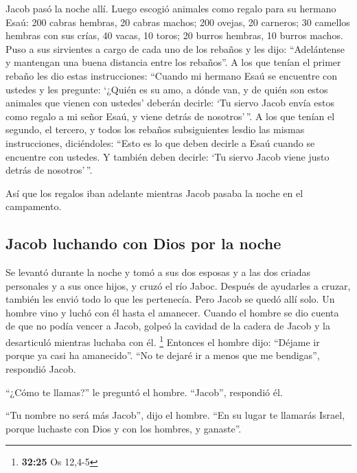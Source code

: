  Jacob pasó la noche allí. Luego escogió animales como
regalo para su hermano Esaú:  200 cabras hembras, 20
cabras machos; 200 ovejas, 20 carneros;  30 camellos
hembras con sus crías, 40 vacas, 10 toros; 20 burros hembras, 10 burros
machos.  Puso a sus sirvientes a cargo de cada uno de los
rebaños y les dijo: ``Adelántense y mantengan una buena distancia entre
los rebaños''.  A los que tenían el primer rebaño les dio
estas instrucciones: ``Cuando mi hermano Esaú se encuentre con ustedes y
les pregunte: `¿Quién es su amo, a dónde van, y de quién son estos
animales que vienen con ustedes'  deberán decirle: `Tu
siervo Jacob envía estos como regalo a mi señor Esaú, y viene detrás de
nosotros'\,''.  A los que tenían el segundo, el tercero,
y todos los rebaños subsiguientes lesdio las mismas instrucciones,
diciéndoles: ``Esto es lo que deben decirle a Esaú cuando se encuentre
con ustedes.  Y también deben decirle: `Tu siervo Jacob
viene justo detrás de nosotros'\,''.

 Así que los regalos iban adelante mientras Jacob pasaba
la noche en el campamento.

\hypertarget{jacob-luchando-con-dios-por-la-noche}{%
\subsection{Jacob luchando con Dios por la
noche}\label{jacob-luchando-con-dios-por-la-noche}}

 Se levantó durante la noche y tomó a sus dos esposas y a
las dos criadas personales y a sus once hijos, y cruzó el río Jaboc.
 Después de ayudarles a cruzar, también les envió todo lo
que les pertenecía.  Pero Jacob se quedó allí solo. Un
hombre vino y luchó con él hasta el amanecer.  Cuando el
hombre se dio cuenta de que no podía vencer a Jacob, golpeó la cavidad
de la cadera de Jacob y la desarticuló mientras luchaba con él.
\footnote{\textbf{32:25} Os 12,4-5}  Entonces el hombre
dijo: ``Déjame ir porque ya casi ha amanecido''. ``No te dejaré ir a
menos que me bendigas'', respondió Jacob.

 ``¿Cómo te llamas?'' le preguntó el hombre. ``Jacob'',
respondió él.

 ``Tu nombre no será más Jacob'', dijo el hombre. ``En su
lugar te llamarás Israel, porque luchaste con Dios y con los hombres, y
ganaste''.


